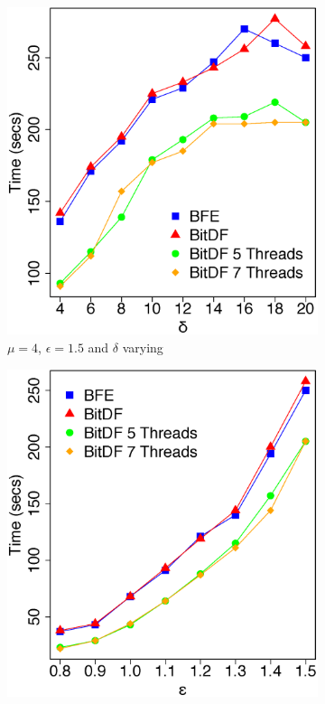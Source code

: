 {\begin{figure}[h!]
    \centering
    \begin{subfigure}[t]{0.49\textwidth}
        \includegraphics[width=\textwidth]{images/Trucks_complete_varying_l.eps}
        \caption{$\mu = 4$, $\epsilon = 1.5$ and $\delta$ varying}
        \label{fig:trucks_complete_vary_l}
    \end{subfigure}
    \begin{subfigure}[t]{0.49\textwidth}
        \includegraphics[width=\textwidth]{images/Trucks_complete_varying_g.eps}

\end{subfigure}
\end{figure}}
